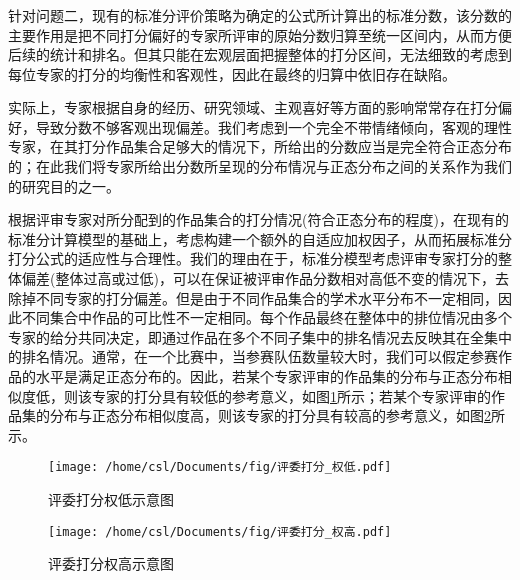 \documentclass[bwprint]{gmcmthesis}
\begin{document}
	\subsubsection{}
	\par
	针对问题二，现有的标准分评价策略为确定的公式所计算出的标准分数，该分数的主要作用是把不同打分偏好的专家所评审的原始分数归算至统一区间内，从而方便后续的统计和排名。但其只能在宏观层面把握整体的打分区间，无法细致的考虑到每位专家的打分的均衡性和客观性，因此在最终的归算中依旧存在缺陷。
	\par
	实际上，专家根据自身的经历、研究领域、主观喜好等方面的影响常常存在打分偏好，导致分数不够客观出现偏差。我们考虑到一个完全不带情绪倾向，客观的理性专家，在其打分作品集合足够大的情况下，所给出的分数应当是完全符合正态分布\cite{johnson1987normal}的；在此我们将专家所给出分数所呈现的分布情况与正态分布之间的关系作为我们的研究目的之一。
	
	根据评审专家对所分配到的作品集合的打分情况(符合正态分布的程度)，在现有的标准分计算模型\cite{孙荣恒2000概率论和数理统计}的基础上，考虑构建一个额外的自适应加权因子，从而拓展标准分打分公式的适应性与合理性。我们的理由在于，标准分模型考虑评审专家打分的整体偏差(整体过高或过低)，可以在保证被评审作品分数相对高低不变的情况下，去除掉不同专家的打分偏差。但是由于不同作品集合的学术水平分布不一定相同，因此不同集合中作品的可比性不一定相同。每个作品最终在整体中的排位情况由多个专家的给分共同决定，即通过作品在多个不同子集中的排名情况去反映其在全集中的排名情况。通常，在一个比赛中，当参赛队伍数量较大时，我们可以假定参赛作品的水平是满足正态分布的。因此，若某个专家评审的作品集的分布与正态分布相似度低，则该专家的打分具有较低的参考意义，如图\ref{fig:评委打分权低示意图}所示；若某个专家评审的作品集的分布与正态分布相似度高，则该专家的打分具有较高的参考意义，如图\ref{fig:评委打分权高示意图}所示。
	
	
	\begin{figure}[h]
		\centering
		\texttt{[image: /home/csl/Documents/fig/评委打分\_权低.pdf]}
		\caption{\normf 评委打分权低示意图}
		\label{fig:评委打分权低示意图}
	\end{figure}
	\begin{figure}[h]
		\centering
		\texttt{[image: /home/csl/Documents/fig/评委打分\_权高.pdf]}
		\caption{\normf 评委打分权高示意图}
		\label{fig:评委打分权高示意图}
	\end{figure}
	
\end{document}
